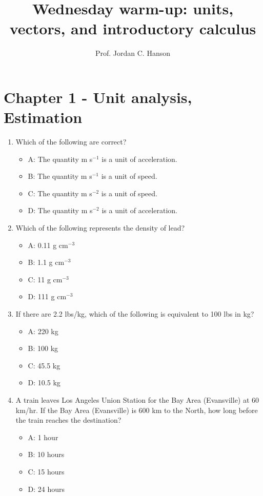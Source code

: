 \documentclass{article}
\begin{document}
\twocolumn

\title{Wednesday warm-up: units, vectors, and introductory calculus}
\author{Prof. Jordan C. Hanson}

\maketitle

\section{Chapter 1 - Unit analysis, \\ Estimation}

\begin{enumerate}
\item Which of the following are correct?
\begin{itemize}
\item A: The quantity m s$^{-1}$ is a unit of acceleration.
\item B: The quantity m s$^{-1}$ is a unit of speed.
\item C: The quantity m s$^{-2}$ is a unit of speed.
\item D: The quantity m s$^{-2}$ is a unit of acceleration.
\end{itemize}
\item Which of the following represents the density of lead?
\begin{itemize}
\item A: 0.11 g cm$^{-3}$
\item B: 1.1 g cm$^{-3}$
\item C: 11 g cm$^{-3}$
\item D: 111 g cm$^{-3}$
\end{itemize}
\item If there are 2.2 lbs/kg, which of the following is equivalent to 100 lbs in kg?
\begin{itemize}
\item A: 220 kg
\item B: 100 kg
\item C: 45.5 kg
\item D: 10.5 kg
\end{itemize}
\item A train leaves Los Angeles Union Station for the Bay Area (Evansville) at 60 km/hr.  If the Bay Area (Evansville) is 600 km to the North, how long before the train reaches the destination?
\begin{itemize}
\item A: 1 hour
\item B: 10 hours
\item C: 15 hours
\item D: 24 hours
\end{itemize}
\end{enumerate}
\end{document}
